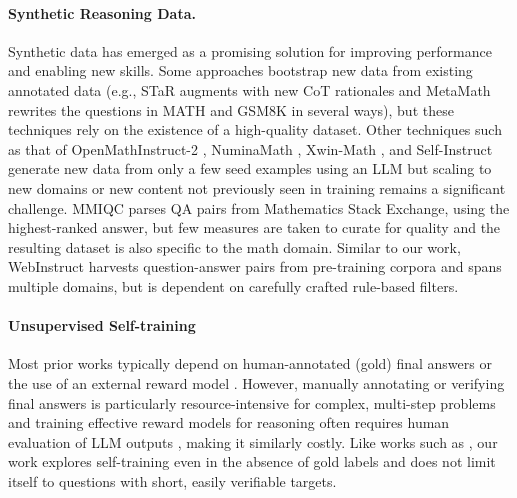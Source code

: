 \paragraph{Synthetic Reasoning Data.} Synthetic data has emerged as a promising solution for improving performance and enabling new skills. Some approaches bootstrap new data from existing annotated data (e.g., STaR \cite{zelikman2022star} augments with new CoT rationales and MetaMath \cite{yumetamath} rewrites the questions in MATH and GSM8K in several ways), but these techniques rely on the existence of a high-quality dataset. Other techniques such as that of OpenMathInstruct-2 \cite{toshniwal24openmathinstruct}, NuminaMath \cite{numina_math_datasets}, Xwin-Math \cite{li2024common}, and Self-Instruct \cite{wang2023self} generate new data from only a few seed examples using an LLM but scaling to new domains or new content not previously seen in training remains a significant challenge. MMIQC \cite{liu2024augmenting} parses QA pairs from Mathematics Stack Exchange, using the highest-ranked answer, but few measures are taken to curate for quality and the resulting dataset is  also specific to the math domain. Similar to our work, WebInstruct \cite{yue2024mammoth2} harvests question-answer pairs from pre-training corpora and spans multiple domains, but is dependent on carefully crafted rule-based filters. 



\paragraph{Unsupervised Self-training} Most prior works typically depend on human-annotated (gold) final answers \citep{zelikman2022star, chen2024self, pang2024iterative} or the use of an external reward model \citep{singh2023beyond, dong2023raft}. However, manually annotating or verifying final answers is particularly resource-intensive for complex, multi-step problems and training effective reward models for reasoning often requires human evaluation of LLM outputs \citep{cobbe2021training, uesato2022solving, lightman2023let}, making it similarly costly. Like works such as \citet{she2024mapo, yuan2024selfrewarding, rosset2024direct, viethoangtranduong}, our work explores self-training even in the absence of gold labels and does not limit itself to questions with short, easily verifiable targets.



